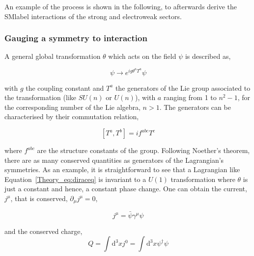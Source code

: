 An example of the process is shown in the following, to afterwards derive the \acrshort{SMlabel} interactions of the strong and electroweak sectors. 

\subsubsection{Gauging a symmetry to interaction}

A general global transformation $\theta$ which acts on the field $\psi$ is described as,

\begin{equation}
    \psi\rightarrow e^{ig\theta^aT^a}\psi
\end{equation}

with $g$ the coupling constant and $T^a$ the generators of the Lie group associated to the transformation
(like $SU(n)$ or $U(n)$), with $a$ ranging from 1 to $n^2-1$, for the corresponding number of the Lie algebra, $n>1$.
The generators can be characterised by their commutation relation, 

\begin{equation}
\label{Theory_eq:nonabcomutator}
    [T^a,T^b]=if^{abc}T^c
\end{equation}

where $f^{abc}$ are the structure constants of the group. Following Noether's theorem, there are as many conserved quantities as
generators of the Lagrangian's symmetries. As an example, it is straightforward to see that a Lagrangian like
Equation~\ref{Theory_eq:diraceq} is invariant to a $U(1)$ transformation where $\theta$ is just a constant and hence, a constant phase change.
One can obtain the current, $j^\mu$, that is conserved, $\partial_\mu j^\mu = 0$,

\begin{equation}
    j^\mu = \bar{\psi}\gamma^\mu\psi
\end{equation}

and the conserved charge,
\begin{equation}
Q=\int \mathrm{d}^3x j^0 = \int \mathrm{d}^3x\psi^{\dag}\psi %
\end{equation}



